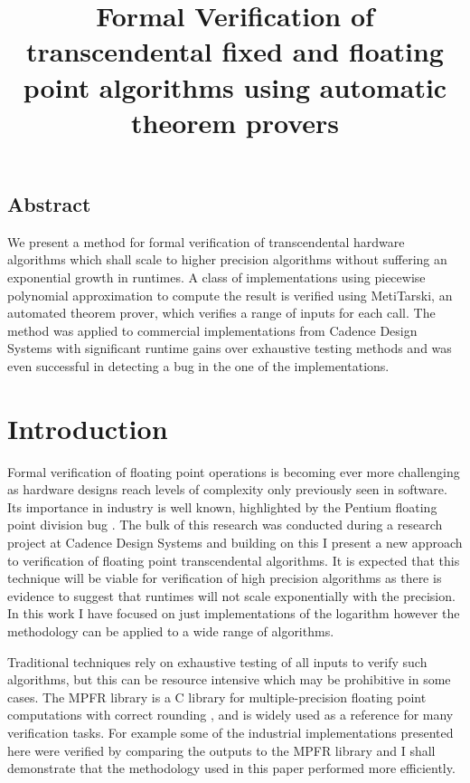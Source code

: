 \documentclass[a4]{article}
\begin{document}
\title{Formal Verification of transcendental fixed and floating point algorithms using automatic theorem provers}
\maketitle

\normalsize
\begin{center}
\section*{Abstract}
\end{center}
We present a method for formal verification of transcendental hardware algorithms which shall scale to higher precision algorithms without suffering an exponential growth in runtimes. A class of implementations using piecewise polynomial approximation to compute the result is verified using MetiTarski, an automated theorem prover, which verifies a range of inputs for each call. The method was applied to commercial implementations from Cadence Design Systems with significant runtime gains over exhaustive testing methods and was even successful in detecting a bug in the one of the implementations.  

\section{Introduction}

Formal verification of floating point operations is becoming ever more challenging as hardware designs reach levels of complexity only previously seen in software. Its importance in industry is well known, highlighted by the Pentium floating point division bug \cite{pratt1995anatomy}. The bulk of this research was conducted during a research project at Cadence Design Systems and building on this I present a new approach to verification of floating point transcendental algorithms. It is expected that this technique will be viable for verification of high precision algorithms as there is evidence to suggest that runtimes will not scale exponentially with the precision. In this work I have focused on just implementations of the logarithm however the methodology can be applied to a wide range of algorithms. 

Traditional techniques rely on exhaustive testing of all inputs to verify such algorithms, but this can be resource intensive which may be prohibitive in some cases. The MPFR library is a C library for multiple-precision floating point computations with correct rounding \cite{fousse2007mpfr}, and is widely used as a reference for many verification tasks. For example some of the industrial implementations presented here were verified by comparing the outputs to the MPFR library and I shall demonstrate that the methodology used in this paper performed more efficiently. 
\end{document}
